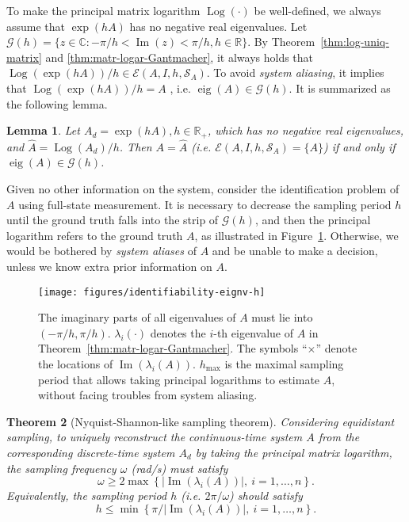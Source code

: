 \documentclass[letterpaper,10pt,journal,final]{IEEEtran}
\newtheorem{theorem}{Theorem}
\newtheorem{lemma}[theorem]{Lemma}
\theoremstyle{definition}
\theoremstyle{remark}
\newcommand{\im}{\operatorname{Im}}
\newcommand{\Log}{\operatorname{Log}}
\newcommand{\eig}{\operatorname{eig}}
\begin{document}
To make the principal matrix logarithm $\Log(\cdot)$ be well-defined, we always assume
that $\exp(hA)$ has no negative real eigenvalues.  Let
$\mathscr{G}(h) = \{z \in \mathbb{C}: -\pi/h < \im(z) < \pi/h, h \in \mathbb{R}\}$.
By Theorem~\ref{thm:log-uniq-matrix} and \ref{thm:matr-logar-Gantmacher}, it always
holds that $\Log(\exp(h A))/h \in \mathscr{E}(A, I, h, \mathscr{S}_A)$. To avoid
\emph{system aliasing}, it implies that $\Log(\exp(h A))/h = A$ , i.e.
$\eig(A) \in \mathscr{G}(h)$. It is summarized as the following lemma.

\begin{lemma}
  \label{lemma:A=Ahat}
  Let $A_d = \exp(hA), h\in\mathbb{R}_+$, which has no negative real eigenvalues,
  and $\hat{A} = \Log(A_d)/h$. Then $A = \hat{A}$
  (i.e. $\mathscr{E}(A,I,h,\mathscr{S}_A) = \{A\}$) if and only if
  $\eig(A) \in \mathcal{G}(h)$.
\end{lemma}

Given no other information on the system, consider the identification problem of $A$
using full-state measurement. It is necessary to decrease the sampling period $h$
until the ground truth falls into the strip of $\mathscr{G}(h)$, and then the
principal logarithm refers to the ground truth $A$, as illustrated in
Figure~\ref{fig:h-vs-eigv-identifi}. Otherwise, we would be bothered by \emph{system
  aliases} of $A$ and be unable to make a decision, unless we know extra prior
information on $A$.

\begin{figure}[htb]
 \centering
 \texttt{[image: figures/identifiability-eignv-h]}
 \caption{The imaginary parts of all eigenvalues of $A$ must lie into $(-\pi/h, \pi/h)$. $\lambda_i(\cdot)$ denotes the $i$-th eigenvalue of $A$ in Theorem~\ref{thm:matr-logar-Gantmacher}. The symbols ``{\tiny$\times$}'' denote the locations of $\im(\lambda_i(A))$. $h_\mathrm{max}$ is the maximal sampling period that allows taking principal logarithms to estimate $A$, without facing troubles from system aliasing.}
 \label{fig:h-vs-eigv-identifi}
\end{figure}


\begin{theorem}[Nyquist-Shannon-like sampling theorem]
  \label{thm:identifi-largest-sampl-period}
  Considering equidistant sampling, to uniquely reconstruct the continuous-time
  system ${A}$ from the corresponding discrete-time system $A_d$ by taking the
  principal matrix logarithm, the sampling frequency $\omega$ \textup{(rad/s)}
  must satisfy
  \begin{displaymath}
    \omega \geq 2\max \left\{ |\im\left(\lambda_i({A})\right)|,\ i = 1,\dots,n \right\}.
  \end{displaymath}
  Equivalently, the sampling period $h$ (i.e. $2\pi/\omega$) should satisfy
  \begin{displaymath}
    h \leq \min \left\{ \pi / |\im\left(\lambda_i({A})\right)|,\ i = 1,\dots,n \right\}.
  \end{displaymath}
\end{theorem}
\end{document}
